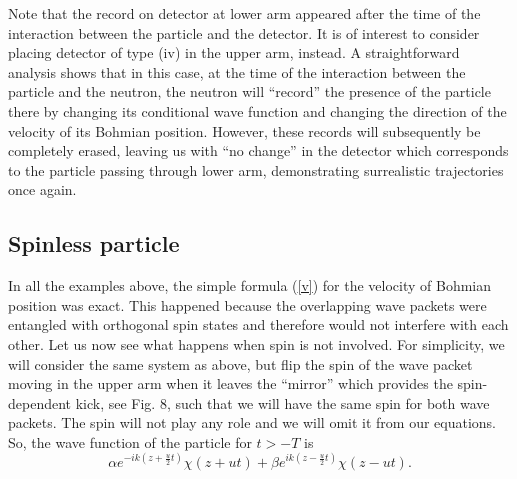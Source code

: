 \documentclass[preprint,tightenlines]{elsarticle}
\begin{document}
Note that the record on detector at lower arm appeared after the
time of the interaction between the particle and the detector. It
is of interest to consider placing detector of type (iv) in the upper arm, instead. A straightforward analysis shows that in this case,
at the time of the interaction between the particle and the neutron,
the neutron will ``record'' the presence of the particle there by changing its conditional wave function and changing the direction
of the velocity of its Bohmian position. However, these records will subsequently
be completely erased, leaving us with ``no change'' in the detector
which corresponds to the particle  passing through
lower arm, demonstrating surrealistic trajectories once again.


\subsection{ Spinless particle}



In all the examples above, the simple formula (\ref{v}) for the velocity
of Bohmian position was exact. This happened because the overlapping
wave packets were entangled with orthogonal spin states and therefore would not interfere with each other. Let us now
see what happens when spin is not involved. For simplicity, we will
consider the same system as above, but flip the spin of the
wave packet moving in the upper arm when it leaves the ``mirror'' which provides the spin-dependent kick, see Fig. 8,
  such that we will have the same spin for both wave packets. The spin will not play any role and we will omit it from our equations.
So, the wave function of the particle for $t>-T$ is
 \begin{equation}
\alpha e^{-ik(z+\frac{u}{2}t)}\chi(z+ut)+\beta e^{ik(z-\frac{u}{2}t)}\chi(z-ut).\label{psioutnospin}
\end{equation}
\end{document}
